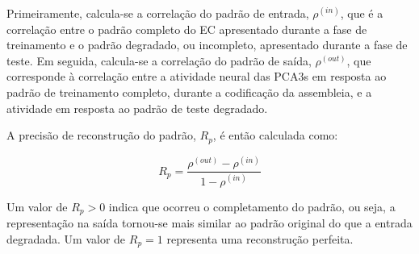 Primeiramente, calcula-se a correlação do padrão de entrada, $\rho^{(in)}$, que é a correlação entre o padrão completo do EC
apresentado durante a fase de treinamento e o padrão degradado, ou incompleto, apresentado durante a fase de teste. Em seguida,
calcula-se a correlação do padrão de saída, $\rho^{(out)}$, que corresponde à correlação entre a atividade neural das PCA3s em
resposta ao padrão de treinamento completo, durante a codificação da assembleia, e a atividade em resposta ao padrão de teste
degradado.

A precisão de reconstrução do padrão, $R_p$, é então calculada como:

\begin{equation}
    \label{eq:rp}
    R_p = \frac{\rho^{(out)} - \rho^{(in)}}{1 - \rho^{(in)}}
\end{equation}

Um valor de $R_p > 0$ indica que ocorreu o completamento do padrão, ou seja, a representação na saída tornou-se mais similar ao
padrão original do que a entrada degradada. Um valor de $R_p = 1$ representa uma reconstrução perfeita.
